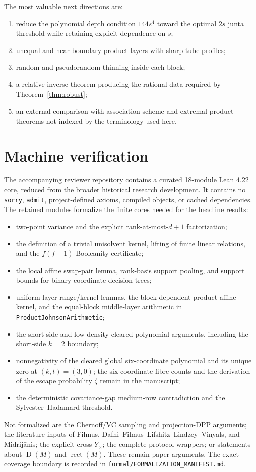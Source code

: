 \documentclass[11pt]{article}
\theoremstyle{definition}
\theoremstyle{remark}
\newcommand{\1}{\mathbf 1}
\newcommand{\rect}{\operatorname{rect}}
\newcommand{\Dcc}{\operatorname{D}}
\begin{document}
The most valuable next directions are:
\begin{enumerate}
\item reduce the polynomial depth condition $144s^4$ toward the optimal
$2s$ junta threshold while retaining explicit dependence on $s$;
\item unequal and near-boundary product layers with sharp tube profiles;
\item random and pseudorandom thinning inside each block;
\item a relative inverse theorem producing the rational data required by
Theorem~\ref{thm:robust};
\item an external comparison with association-scheme and extremal product
theorems not indexed by the terminology used here.
\end{enumerate}

\section{Machine verification}

The accompanying reviewer repository contains a curated 18-module Lean 4.22
core, reduced from the broader historical research development.  It contains
no \texttt{sorry}, \texttt{admit}, project-defined axioms, compiled objects,
or cached dependencies.  The retained modules formalize the finite cores
needed for the headline results:
\begin{itemize}
\item two-point variance and the explicit rank-at-most-$d+1$ factorization;
\item the definition of a trivial unisolvent kernel, lifting of finite linear
relations, and the $f(f-1)$ Booleanity certificate;
\item the local affine swap-pair lemma, rank-basis support pooling, and support
bounds for binary coordinate decision trees;
\item uniform-layer range/kernel lemmas, the block-dependent product affine
kernel, and the equal-block middle-layer arithmetic in
\texttt{ProductJohnsonArithmetic};
\item the short-side and low-density cleared-polynomial arguments, including
the short-side $k=2$ boundary;
\item nonnegativity of the cleared global six-coordinate polynomial and its
unique zero at $(k,t)=(3,0)$; the six-coordinate fibre counts and the
derivation of the escape probability $\zeta$ remain in the manuscript;
\item the deterministic covariance-gap medium-row contradiction and the
Sylvester--Hadamard threshold.
\end{itemize}
Not formalized are the Chernoff/VC sampling and projection-DPP arguments; the
literature inputs of Filmus, Dafni--Filmus--Lifshitz--Lindzey--Vinyals, and
Midrij\={a}nis; the explicit cross $Y_{\times}$; the complete protocol
wrappers; or statements about $\Dcc(M)$ and $\rect(M)$.  These remain paper
arguments.  The exact coverage boundary is recorded in
\nolinkurl{formal/FORMALIZATION_MANIFEST.md}.
\end{document}
